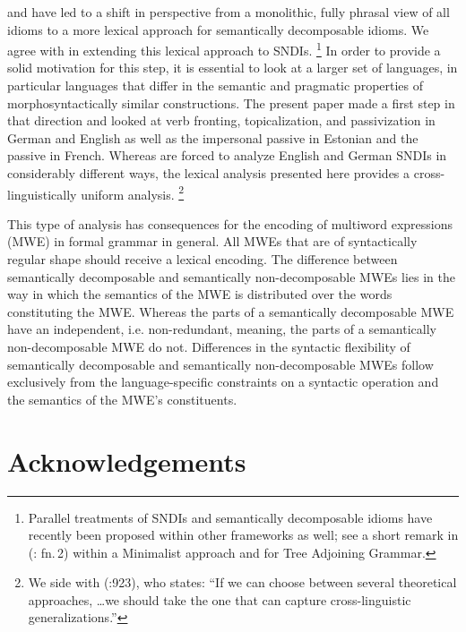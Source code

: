 \documentclass[output=paper]{langsci/langscibook}
\begin{document}
\cite{Wasow:al:83} and \cite{Nunberg1994} have led to a shift in perspective from a monolithic, fully phrasal view of all idioms to a more lexical approach for  semantically decomposable idioms. We agree with \cite{kaysagidioms} in extending this lexical approach to SNDIs.%
\footnote{Parallel treatments of SNDIs and semantically decomposable idioms have recently been proposed within other frameworks as well; see a short remark in \citeauthor{Harley:Stone:13} (\citeyear{Harley:Stone:13}: fn.\,2) within a Minimalist approach and \cite{Lichte:Kallmeyer:16} for Tree Adjoining Grammar.}
%
In order to provide a solid motivation for this step, it is essential to look at a larger set of languages, in particular languages that differ in the semantic and pragmatic properties of morphosyntactically similar constructions. The present paper made a first step in that direction and looked at verb fronting,  topicalization, and passivization in German and English as well as the impersonal passive in Estonian and the passive in French. Whereas \cite{Nunberg1994} are forced to analyze English and German SNDIs in considerably different ways, the lexical analysis presented here provides a cross-linguistically uniform analysis.%
\footnote{We side with \citeauthor{Mueller:13Unifying} (\citeyear{Mueller:13Unifying}:923), who states: ``If we can choose between several theoretical approaches, \ldots we should take the one that can capture cross-linguistic generalizations.''}

This type of analysis has consequences for the encoding of multiword expressions (MWE) in formal grammar in general. All MWEs that are of syntactically regular shape should receive a lexical encoding. The difference between  semantically decomposable and  semantically non-decomposable MWEs lies in the way in which the semantics of the MWE is distributed over the words constituting the MWE. Whereas the parts of a semantically decomposable MWE have an independent, i.e. non-redundant, meaning, the parts of a semantically non-decomposable MWE do not. Differences in the syntactic flexibility of semantically decomposable and semantically non-decomposable MWEs follow exclusively from the language-specific constraints on a syntactic operation and the semantics of the MWE's constituents.

\section*{Acknowledgements}
\end{document}
